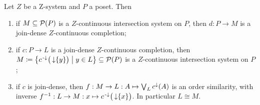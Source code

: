 \begin{proposition} \label{classificationZcontinuousCompletions}
Let $Z$ be a $\mathrm{Z}$-system and $P$ a poset. Then
\begin{enumerate}
\item if $M \subseteq \operatorname{\mathcal{P}}(P)$ is a $Z$-continuous intersection system on $P$, then $d: P \to M$ is a join-dense $Z$-continuous completion;
\item if $c: P\to L$ is a join-dense $Z$-continuous completion, then $M \defeq \setbuilder{c^\preimf\big(\downset \{y\}\big)}{y \in L} \subseteq \powerset(P)$ is a $Z$-continuous intersection system on $P$;
\item if $c$ is join-dense, then $f: M \to L: A\mapsto \bigvee_L c^\downarrow(A)$ is an order similarity, with inverse $f^{-1}: L \to M: x\mapsto c^{\text{\hspace{0.15em}-}\downarrow}\big(\operatorname{\downarrow}\{x\}\big)$. In particular $L \cong M$.
\end{enumerate}
\end{proposition}
